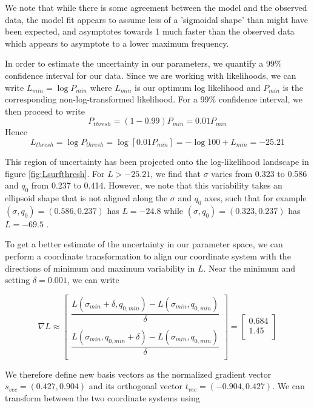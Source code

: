 \documentclass{article}
\begin{document}
We note that while there is some agreement between the model and the observed data, the model fit appears to assume less of a 'sigmoidal shape' than might have been expected, and asymptotes towards 1 much faster than the observed data which appears to asymptote to a lower maximum frequency.

In order to estimate the uncertainty in our parameters, we quantify a 99\% confidence interval for our data. Since we are working with likelihoods, we can write $L_{min} = \log{P_{min}}$ where $L_{min}$ is our optimum log likelihood and $P_{min}$ is the corresponding non-log-transformed likelihood. For a 99\% confidence interval, we then proceed to write
\begin{equation*}
P_{thresh} = (1-0.99) P_{min} = 0.01 P_{min}
\end{equation*}
Hence
\begin{equation*}
L_{thresh} = \log{P_{thresh}} = \log{[0.01 P_{min}]} = -\log{100}+L_{min} = -25.21
\end{equation*}

This region of uncertainty has been projected onto the log-likelihood landscape in figure \ref{fig:Lsurfthresh}.
For $L > -25.21$, we find that $\sigma$ varies from 0.323 to 0.586 and $q_0$ from 0.237 to 0.414. However, we note that this variability takes an ellipsoid shape that is not aligned along the $\sigma$ and $q_0$ axes, such that for example $(\sigma, q_0) = (0.586, 0.237)$ has $L = -24.8 $ while  $(\sigma, q_0) = (0.323, 0.237)$ has $L = -69.5 $ .

To get a better estimate of the uncertainty in our parameter space, we can perform a coordinate transformation to align our coordinate system with the directions of minimum and maximum variability in $L$.
Near the minimum and setting $\delta = 0.001$, we can write

\[
\nabla L 
\approx 
\begin{bmatrix}
   \dfrac{L(\sigma_{min}+\delta, q_{0,min})-L(\sigma_{min}, q_{0,min})}{\delta} \\
  ~\\
   \dfrac{L(\sigma_{min}, q_{0,min}+\delta)-L(\sigma_{min}, q_{0,min})}{\delta} \\
\end{bmatrix}
=
\begin{bmatrix}
0.684 \\
1.45 \\
\end{bmatrix}
\]


We therefore define new basis vectors as the normalized gradient vector $s_{vec} = (0.427, 0.904) $ and its orthogonal vector $t_{vec} = (-0.904, 0.427) $.
We can transform between the two coordinate systems using 
\end{document}
